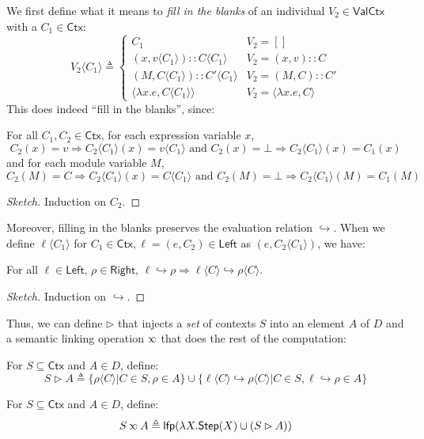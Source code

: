 \documentclass[acmsmall,screen,review]{acmart}\settopmatter{printfolios=true,printccs=false,printacmref=false}
\newcommand*{\cons}{::}
\newcommand*{\Ctx}{\mathsf{Ctx}}
\newcommand*{\Value}{\mathsf{Val}}
\newcommand*{\Left}{\mathsf{Left}}
\newcommand*{\Right}{\mathsf{Right}}
\newcommand*{\lfp}{\mathsf{lfp}}
\newcommand*{\Step}{\mathsf{Step}}
\newcommand*{\semarrow}{\hookrightarrow}
\newcommand*{\semlink}{\mathbin{\rotatebox[origin=c]{180}{$\propto$}}}
\newcommand*{\inject}[2]{{#2}\langle{#1}\rangle}
\begin{document}
We first define what it means to \emph{fill in the blanks} of an individual $V_2\in\Value\Ctx$ with a $C_1\in\Ctx$:
\[
  \inject{C_{1}}{V_{2}}\triangleq
  \begin{cases}
    C_1                                           & V_{2}=[]                        \\
    (x, \inject{C_1}{v})\cons\inject{C_{1}}{C}    & V_{2}=(x,v)\cons C              \\
    (M, \inject{C_{1}}{C})\cons\inject{C_{1}}{C'} & V_{2}=(M,C)\cons C'             \\
    \langle\lambda x.e,\inject{C_1}{C}\rangle     & V_2=\langle\lambda x.e,C\rangle
  \end{cases}
\]
This does indeed ``fill in the blanks'', since:
\begin{lemma}
  For all $C_1,C_2\in\Ctx$, for each expression variable $x$,
  \[
    C_2(x)=v\Rightarrow\inject{C_1}{C_2}(x)=\inject{C_1}{v}\text{ and }C_2(x)=\bot\Rightarrow\inject{C_1}{C_2}(x)=C_1(x)
  \]
  and for each module variable $M$,
  \[
    C_2(M)=C\Rightarrow\inject{C_1}{C_2}(x)=\inject{C_1}{C}\text{ and }C_2(M)=\bot\Rightarrow\inject{C_1}{C_2}(M)=C_1(M)
  \]
\end{lemma}
\begin{proof}[Sketch]
  Induction on $C_2$.
\end{proof}

Moreover, filling in the blanks preserves the evaluation relation $\semarrow$.
When we define $\inject{C_1}{\ell}$ for $C_1\in\Ctx,\ell=(e,C_2)\in\Left$ as $(e,\inject{C_1}{C_2})$, we have:
\begin{lemma}
  For all $\ell\in\Left$, $\rho\in\Right$, $\ell\semarrow\rho\Rightarrow\inject{C}{\ell}\semarrow\inject{C}{\rho}$.
\end{lemma}
\begin{proof}[Sketch]
  Induction on $\semarrow$.
\end{proof}

Thus, we can define $\rhd$ that injects a \emph{set} of contexts $S$ into an element $A$ of $D$ and a semantic linking operation $\semlink$ that does the rest of the computation:
\begin{definition}[Injection]
  For $S\subseteq\Ctx$ and $A\in D$, define:
  \[S\rhd A\triangleq\{\inject{C}{\rho}|C\in S,\rho\in A\}\cup\{\inject{C}{\ell}\semarrow\inject{C}{\rho}|C\in S,\ell\semarrow\rho\in A\}\]
\end{definition}
\begin{definition}
  For $S\subseteq\Ctx$ and $A\in D$, define:
  \[S\semlink A\triangleq\lfp(\lambda X.\Step(X)\cup(S\rhd A))\]
\end{definition}
\end{document}
